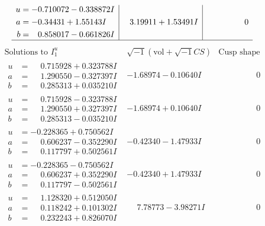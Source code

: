 \documentclass[1p]{elsarticle_modified}
\theoremstyle{definition}
\newcommand{\I}{\sqrt{-1}}
\begin{document}
$$\begin{array}{c|c|c}
\begin{aligned}
u &= -0.710072 - 0.338872 I \\
a &= -0.34431 + 1.55143 I \\
b &= \phantom{-}0.858017 - 0.661826 I\end{aligned}
 & \phantom{-}3.19911 + 1.53491 I & \phantom{-0.000000 } 0\\
 \hline 
 \end{array}$$\newpage$$\begin{array}{c|c|c}  
\text{Solutions to }I^u_{1}& \I (\text{vol} + \sqrt{-1}CS) & \text{Cusp shape}\\
 \hline 
\begin{aligned}
u &= \phantom{-}0.715928 + 0.323788 I \\
a &= \phantom{-}1.290550 - 0.327397 I \\
b &= \phantom{-}0.285313 + 0.035210 I\end{aligned}
 & -1.68974 - 0.10640 I & \phantom{-0.000000 } 0 \\ \hline\begin{aligned}
u &= \phantom{-}0.715928 - 0.323788 I \\
a &= \phantom{-}1.290550 + 0.327397 I \\
b &= \phantom{-}0.285313 - 0.035210 I\end{aligned}
 & -1.68974 + 0.10640 I & \phantom{-0.000000 } 0 \\ \hline\begin{aligned}
u &= -0.228365 + 0.750562 I \\
a &= \phantom{-}0.606237 - 0.352290 I \\
b &= \phantom{-}0.117797 + 0.502561 I\end{aligned}
 & -0.42340 - 1.47933 I & \phantom{-0.000000 } 0 \\ \hline\begin{aligned}
u &= -0.228365 - 0.750562 I \\
a &= \phantom{-}0.606237 + 0.352290 I \\
b &= \phantom{-}0.117797 - 0.502561 I\end{aligned}
 & -0.42340 + 1.47933 I & \phantom{-0.000000 } 0 \\ \hline\begin{aligned}
u &= \phantom{-}1.128320 + 0.512050 I \\
a &= \phantom{-}0.118242 + 0.101302 I \\
b &= \phantom{-}0.232243 + 0.826070 I\end{aligned}
 & \phantom{-}7.78773 - 3.98271 I & \phantom{-0.000000 } 0 \\ \hline\begin{aligned}

\end{aligned}
\end{array}$$
\end{document}
